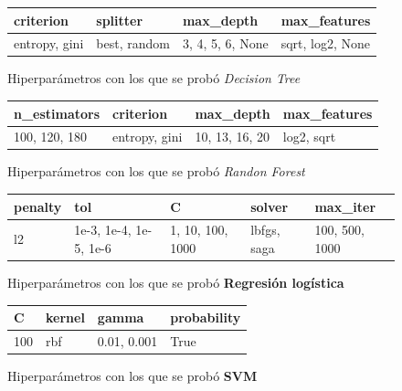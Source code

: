 \begin{appendices}
		\begin{figure}[ht!]
			\centering
			\begin{tabular}{llll}
				\toprule
						criterion &        splitter &           max\_depth &      max\_features \\
				\midrule
				  entropy, gini &  best, random &  3, 4, 5, 6, None &  sqrt, log2, None \\
				\bottomrule
			\end{tabular}
			\caption{Hiperparámetros con los que se probó \emph{Decision Tree}}
			\label{table:8}
		\end{figure}
		
		\begin{figure}[ht!]
			\centering
			\begin{tabular}{llll}
				\toprule
					 n\_estimators &        criterion &          max\_depth &  max\_features \\
				\midrule
				  100, 120, 180 &  entropy, gini &  10,  13, 16, 20 &  log2, sqrt \\
				\bottomrule
			\end{tabular}
			\caption{Hiperparámetros con los que se probó \emph{Randon Forest}}
			\label{table:9}
		\end{figure}

		\begin{figure}[ht!]
			\centering
			\begin{tabular}{lllll}
				\toprule
				 penalty &                       tol &                   C &         solver &        max\_iter \\
				\midrule
					l2 &  1e-3, 1e-4, 1e-5, 1e-6 &  1, 10, 100, 1000 &  lbfgs, saga &  100, 500, 1000 \\
				\bottomrule
			\end{tabular}
			\caption{Hiperparámetros con los que se probó \textbf{Regresión logística}}
			\label{table:10}
		\end{figure}
		\newpage

		\begin{figure}[ht!]
			\centering
			\begin{tabular}{llll}
				\toprule
					  C & kernel &          gamma &  probability \\
				\midrule
				  100 &  rbf &  0.01, 0.001 &         True \\
				\bottomrule
			\end{tabular}
			\caption{Hiperparámetros con los que se probó \textbf{SVM}}
			\label{table:11}
		\end{figure}
		\newpage


\end{appendices}
